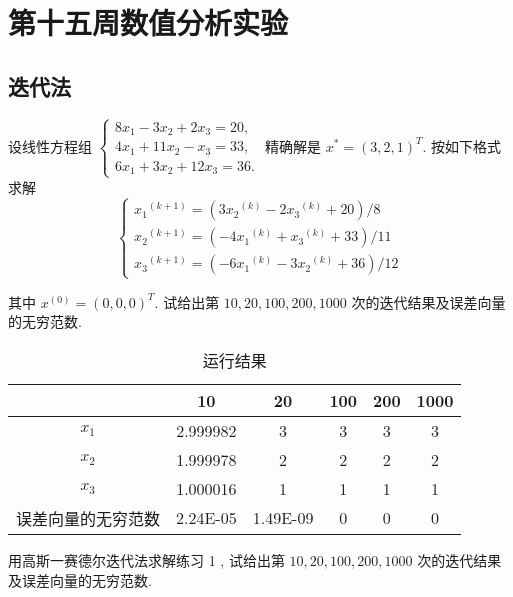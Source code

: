 \section{第十五周数值分析实验}
\subsection{迭代法}
\begin{ex}
设线性方程组 $\left\{\begin{array}{l}8 x_1-3 x_2+2 x_3=20, \\ 4 x_1+11 x_2-x_3=33, \\ 6 x_1+3 x_2+12 x_3=36 .\end{array}\right.$ 精确解是 $x^*=(3,2,1)^T$. 按如下格式求解
$$
\left\{\begin{array}{l}
	x_1{ }^{(k+1)}=\left(3 x_2{ }^{(k)}-2 x_3{ }^{(k)}+20\right) / 8 \\
	x_2{ }^{(k+1)}=\left(-4 x_1{ }^{(k)}+x_3{ }^{(k)}+33\right) / 11 \\
	x_3{ }^{(k+1)}=\left(-6 x_1{ }^{(k)}-3 x_2{ }^{(k)}+36\right) / 12
\end{array}\right.
$$

其中 $x^{(0)}=(0,0,0)^T$. 试给出第 $10,20,100,200,1000$ 次的迭代结果及误差向量的无穷范数.
\end{ex}

\qa 
\begin{table}[H]
	\centering
	\caption{运行结果}
	\begin{tabular}{c|ccccc}
		& 10    & 20    & 100   & 200   & 1000 \\
		\hline
		$x_1$    & 2.999982 & 3     & 3     & 3     & 3 \\
		$x_2$    & 1.999978 & 2     & 2     & 2     & 2 \\
		$x_3$    & 1.000016 & 1     & 1     & 1     & 1 \\
		误差向量的无穷范数 & 2.24E-05 & 1.49E-09 & 0     & 0     & 0 \\
	\end{tabular}%
	\label{tab:addlabelw15-1}%
\end{table}%


\begin{ex}
	用高斯一赛德尔迭代法求解练习 1 , 试给出第 $10,20,100,200,1000$ 次的迭代结果及误差向量的无穷范数.
\end{ex}
